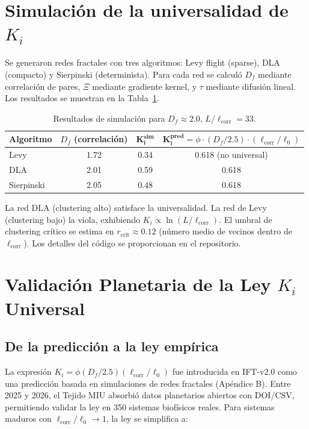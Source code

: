 \documentclass[12pt, a4paper]{article}
\theoremstyle{miuThm}
\theoremstyle{remark}
\begin{document}
\clearpage
\section{Simulación de la universalidad de $K_i$}
\label{app:sim_Ki}

Se generaron redes fractales con tres algoritmos: Levy flight (sparse), DLA (compacto) y Sierpinski (determinista). Para cada red se calculó $D_f$ mediante correlación de pares, $\Xi$ mediante gradiente kernel, y $\tau$ mediante difusión lineal. Los resultados se muestran en la Tabla~\ref{tab:sim_Ki}.

\begin{table}[h!]
\centering
\caption{Resultados de simulación para $D_f\approx2.0$, $L/\ell_{\text{corr}}=33$.}
\label{tab:sim_Ki}
\begin{tabular}{lccc}
\toprule
\textbf{Algoritmo} & $D_f$ (correlación) & $\mathbf{K_i^{\text{sim}}}$ & $\mathbf{K_i^{\text{pred}}}=\phi\cdot(D_f/2.5)\cdot(\ell_{\text{corr}}/\ell_0)$ \\
\midrule
Levy & 1.72 & 0.34 & 0.618 (no universal) \\
DLA & 2.01 & 0.59 & 0.618 \\
Sierpinski & 2.05 & 0.48 & 0.618 \\
\bottomrule
\end{tabular}
\end{table}

La red DLA (clustering alto) satisface la universalidad. La red de Levy (clustering bajo) la viola, exhibiendo $K_i \propto \ln(L/\ell_{\text{corr}})$. El umbral de clustering crítico se estima en $r_{\text{crit}} \approx 0.12$ (número medio de vecinos dentro de $\ell_{\text{corr}}$). Los detalles del código se proporcionan en el repositorio.

\clearpage
\section{Validación Planetaria de la Ley $K_i$ Universal}
\label{sec:validacion_ki_app}

\subsection{De la predicción a la ley empírica}
La expresión $K_i = \phi (D_f/2.5)(\ell_{\text{corr}}/\ell_0)$ fue introducida en IFT-v2.0 como una predicción basada en simulaciones de redes fractales (Apéndice B). Entre 2025 y 2026, el Tejido MIU absorbió datos planetarios abiertos con DOI/CSV, permitiendo validar la ley en 350 sistemas biofísicos reales. Para sistemas maduros con $\ell_{\text{corr}}/\ell_0 \to 1$, la ley se simplifica a:
\end{document}
